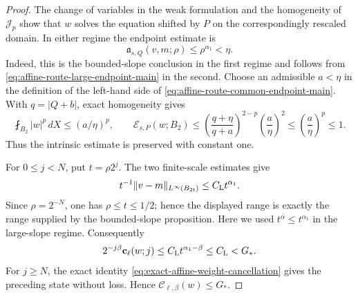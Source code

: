 \documentclass[11pt,reqno]{amsart}
\numberwithin{equation}{section}
\newcommand{\Jp}{\mathcal J_p}
\newcommand{\dd}{\,d}
\theoremstyle{remark}
\begin{document}
\begin{proof}
The change of variables in the weak formulation and the homogeneity of
\(\Jp\) show that \(w\) solves the equation shifted by \(P\) on the
correspondingly rescaled domain.  In either regime the endpoint estimate is
\begin{equation}
 \mathfrak a_{s,Q}(v,m;\rho)\le\rho^{\alpha_1}<\eta.
 \label{eq:affine-route-common-endpoint-main}
\end{equation}
Indeed, this is the bounded-slope conclusion in the first regime and
follows from \eqref{eq:affine-route-large-endpoint-main} in the second.
Choose an admissible \(a<\eta\) in the definition of the left-hand
side of \eqref{eq:affine-route-common-endpoint-main}.  With
\(q=|Q+b|\), exact homogeneity gives
\[
 \fint_{B_2}|w|^p\dd X\le(a/\eta)^p,\qquad
 \mathcal E_{s,P}(w;B_2)
 \le
 \left(\frac{q+\eta}{q+a}\right)^{2-p}
 \left(\frac a\eta\right)^2
 \le\left(\frac a\eta\right)^p\le1.
\]
Thus the intrinsic estimate is preserved with constant one.

For \(0\le j<N\), put \(t=\rho2^j\).  The two finite-scale estimates give
\begin{equation}
 t^{-1}\|v-m\|_{L^\infty(B_{2t})}
 \le C_{\rm L}t^{\alpha_1}.
 \label{eq:affine-route-common-intermediate-main}
\end{equation}
Since \(\rho=2^{-N}\), one has \(\rho\le t\le1/2\); hence the displayed
range is exactly the range supplied by the bounded-slope proposition.
Here we used \(t^{\bar\alpha}\le t^{\alpha_1}\) in the large-slope
regime.  Consequently
\[
2^{-j\beta}\mathbf c_\ell(w;j)
 \le C_{\rm L}t^{\alpha_1-\beta}\le C_{\rm L}<G_*.
\]
For \(j\ge N\), the exact identity
\eqref{eq:exact-affine-weight-cancellation} gives the preceding state without
loss.  Hence \(\mathscr C_{\ell,\beta}(w)\le G_*\).


\end{proof}
\end{document}
